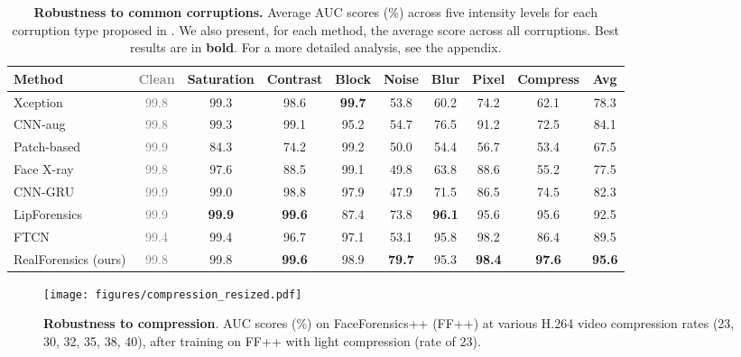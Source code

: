 \documentclass[10pt,twocolumn,letterpaper]{article}
\begin{document}
\begin{table*}
\begin{center}
\begin{tabular}{l | c | c c c c c c c | c}\toprule
Method & \textcolor{gray}{Clean} & Saturation & Contrast & Block & Noise & Blur & Pixel & Compress & Avg \\ \midrule
Xception \cite{rossler2019faceforensics++} & \textcolor{gray}{99.8} & 99.3 & 98.6 & \textbf{99.7} & 53.8 & 60.2 & 74.2 & 62.1 & 78.3 \\
CNN-aug \cite{wang2020cnn} & \textcolor{gray}{99.8} & 99.3 & 99.1 & 95.2 & 54.7 & 76.5 & 91.2 & 72.5 & 84.1 \\
Patch-based \cite{chai2020makes} & \textcolor{gray}{99.9} & 84.3 & 74.2 & 99.2 & 50.0 & 54.4 & 56.7 & 53.4 & 67.5  \\
Face X-ray \cite{li2020face} & \textcolor{gray}{99.8} & 97.6 & 88.5 & 99.1 & 49.8 & 63.8 & 88.6 & 55.2 & 77.5  \\
CNN-GRU \cite{sabir2019recurrent} & \textcolor{gray}{99.9} & 99.0 & 98.8 & 97.9 & 47.9 & 71.5 & 86.5 & 74.5 & 82.3 \\
LipForensics \cite{haliassos2021lips} & \textcolor{gray}{99.9} & \textbf{99.9} & \textbf{99.6} & 87.4 & 73.8 & \textbf{96.1} & 95.6 & 95.6 & 92.5 \\ 
FTCN \cite{zheng2021exploring} & \textcolor{gray}{99.4} & 99.4 & 96.7 & 97.1 & 53.1 & 95.8 & 98.2 & 86.4 & 89.5 \\ \midrule
RealForensics (ours) & \textcolor{gray}{99.8} & 99.8 & \textbf{99.6} & 98.9 & \textbf{79.7} & 95.3 & \textbf{98.4} & \textbf{97.6} & \textbf{95.6} \\
 \bottomrule
\end{tabular}
\end{center}
\caption{\textbf{Robustness to common corruptions.} Average AUC scores (\%) across five intensity levels for each corruption type proposed in \cite{jiang2020deeperforensics}. We also present, for each method, the average score across all corruptions. Best results are in \textbf{bold}. For a more detailed analysis, see the appendix.}
\label{table:robustness}
\end{table*}

\begin{figure}
\begin{center}
  \texttt{[image: figures/compression\_resized.pdf]}
\end{center}
  \caption{\textbf{Robustness to compression}. AUC scores (\%) on FaceForensics++ (FF++) at various H.264 video compression rates (23, 30, 32, 35, 38, 40), after training on FF++ with light compression (rate of 23).}
\label{fig:compression}
\end{figure}
\end{document}
